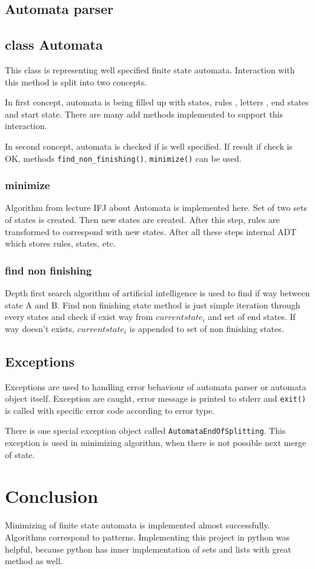 \documentclass[a4paper, 10pt]{article}
\begin{document}
\subsection{Automata parser}



\subsection{class Automata}

This class is representing well specified finite state automata. Interaction with this method is split into two concepts. 

In first concept, automata is being filled up with states, rules , letters , end states and start state. There are many add methods implemented to support this interaction.


In second concept, automata is checked if is well specified. If result if check is OK, methods {\tt find\_non\_finishing()}, {\tt minimize()} can be used.

\subsubsection{minimize}
Algorithm from lecture IFJ about Automata is implemented here. Set of two sets of states is created. Then new states are created. After this step, rules are transformed to correspond with new states. After all these steps internal ADT which stores rules, states, etc. 


\subsubsection{find non finishing} 
Depth first search algorithm of artificial intelligence is used to find if way between state A and B. Find non finishing state method is just simple iteration through every states and check if exist way from $current state_{i}$ and set of end states. If way doesn't exists, $current state_{i}$ is appended to set of non finishing states. 


\subsection{Exceptions}
Exceptions are used to handling error behaviour of automata parser or automata object itself. Exception are caught, error message is printed to stderr and {\tt exit()} is called with specific error code according to error type. 

There is one special exception object called {\tt AutomataEndOfSplitting}. This exception is used in minimizing algorithm, when there is not possible next merge of state.

\section{Conclusion}

Minimizing of finite state automata is implemented almost successfully. Algorithms correspond to patterns. Implementing this project in python was helpful, because python has inner implementation of sets and lists with great method as well. 
\end{document}
